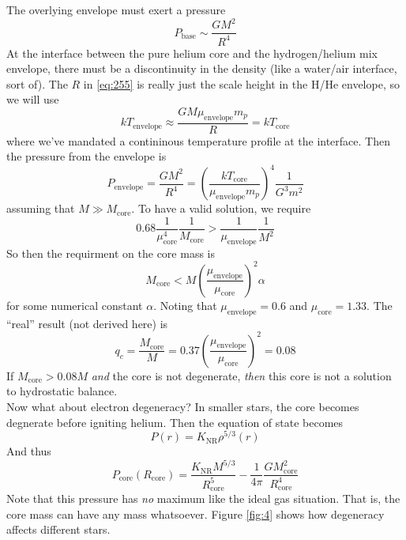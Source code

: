 \documentclass[10pt]{article}
\numberwithin{equation}{section}
\newcommand{\n}{\noindent}
\newcommand{\figref}[1]{Figure \ref{#1}}
\begin{document}
    The overlying envelope must exert a pressure
    \begin{equation}
      \label{eq:255}
      P_{\mathrm{base}}\sim\frac{GM^2}{R^4}
    \end{equation}
    At the interface between the pure helium core and the
    hydrogen/helium mix envelope, there must be a discontinuity in the
    density (like a water/air interface, sort of). The $R$ in
    \eqref{eq:255} is really just the scale height in the H/He
    envelope, so we will use
    \begin{equation}
      \label{eq:256}
      kT_{\mathrm{envelope}}\approx\frac{GM\mu_{\mathrm{envelope}}m_p}{R}=kT_{\mathrm{core}}
    \end{equation}
    where we've mandated a contininous temperature profile at the
    interface. Then the pressure from the envelope is
    \begin{equation}
      \label{eq:257}
      P_{\mathrm{envelope}}=\frac{GM^2}{R^4}=\left(\frac{kT_{\mathrm{core}}}{\mu_{\mathrm{envelope}}m_p}\right)^4\frac{1}{G^3m^2}
    \end{equation}
    assuming that $M\gg M_{\mathrm{core}}$. To have a valid solution,
    we require
    \begin{equation}
      \label{eq:258}
      0.68\frac{1}{\mu_{\mathrm{core}}^4}\frac{1}{M_{\mathrm{core}}}>\frac{1}{\mu_{\mathrm{envelope}}}\frac{1}{M^2}
    \end{equation}
    So then the requirment on the core mass is
    \begin{equation}
      \label{eq:259}
      M_{\mathrm{core}}<M\left(\frac{\mu_{\mathrm{envelope}}}{\mu_{\mathrm{core}}}\right)^2\alpha
    \end{equation}
    for some numerical constant $\alpha$. Noting that
    $\mu_{\mathrm{envelope}}=0.6$ and $\mu_{\mathrm{core}}=1.33$. The
    ``real'' result (not derived here) is
    \begin{equation}
      \label{eq:260}
      q_c=\frac{M_{\mathrm{core}}}{M}=0.37\left(\frac{\mu_{\mathrm{envelope}}}{\mu_{\mathrm{core}}}\right)^2=0.08
    \end{equation}
    If $M_{\mathrm{core}}>0.08M$ \emph{and} the core is not
    degenerate, \emph{then} this core is not a solution to hydrostatic
    balance.\\

    \n Now what about electron degeneracy? In smaller stars, the core
    becomes degnerate before igniting helium. Then the equation of
    state becomes
    \begin{equation}
      \label{eq:261}
      P(r)=K_{\mathrm{NR}}\rho^{5/3}(r)
    \end{equation}
    And thus
    \begin{equation}
      \label{eq:262}
      P_{\mathrm{core}}(R_{\mathrm{core}})=\frac{K_{\mathrm{NR}}M^{5/3}}{R_{\mathrm{core}}^5}-\frac{1}{4\pi}\frac{GM_{\mathrm{core}}^2}{R_{\mathrm{core}}^4}
    \end{equation}
    Note that this pressure has \emph{no} maximum like the ideal gas
    situation. That is, the core mass can have any mass
    whatsoever. \figref{fig:4} shows how degeneracy affects different
    stars.\\
\end{document}

